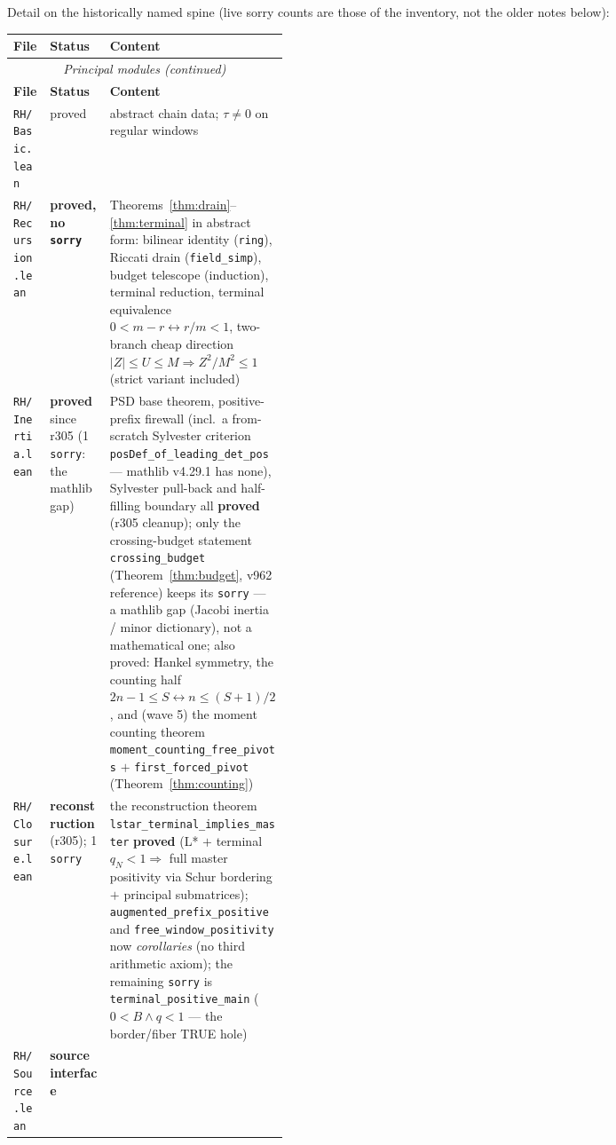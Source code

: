 \documentclass[11pt]{article}
\theoremstyle{definition}
\theoremstyle{remark}
\begin{document}
\noindent Detail on the historically named spine (live sorry counts are
those of the inventory, not the older notes below):

\begingroup\small
\begin{longtable}{@{}llp{0.36\linewidth}@{}}
\toprule
\textbf{File} & \textbf{Status} & \textbf{Content}\\
\midrule
\endfirsthead
\multicolumn{3}{c}{\small\itshape Principal modules (continued)}\\
\toprule
\textbf{File} & \textbf{Status} & \textbf{Content}\\
\midrule
\endhead
\texttt{RH/Basic.lean} & proved & abstract chain data; $\tau\ne0$ on
regular windows\\
\texttt{RH/Recursion.lean} & \textbf{proved, no \texttt{sorry}} &
Theorems~\ref{thm:drain}--\ref{thm:terminal} in abstract form: bilinear
identity (\texttt{ring}), Riccati drain (\texttt{field\_simp}), budget
telescope (induction), terminal reduction, terminal equivalence
$0<m-r\leftrightarrow r/m<1$, two-branch cheap direction
$|Z|\le U\le M\Rightarrow Z^2/M^2\le1$ (strict variant included)\\
\texttt{RH/Inertia.lean} & \textbf{proved} since r305 (1
\texttt{sorry}: the mathlib gap) & PSD base theorem, positive-prefix
firewall (incl.\ a from-scratch Sylvester criterion
\texttt{posDef\_of\_leading\_det\_pos} --- mathlib v4.29.1 has
none), Sylvester pull-back and half-filling boundary all
\textbf{proved} (r305 cleanup); only the crossing-budget statement
\texttt{crossing\_budget} (Theorem~\ref{thm:budget}, v962
reference) keeps its \texttt{sorry} --- a mathlib gap (Jacobi
inertia / minor dictionary), not a mathematical one; also proved:
Hankel symmetry, the counting half
$2n-1\le S\leftrightarrow n\le(S{+}1)/2$, and (wave 5) the moment
counting theorem \texttt{moment\_counting\_free\_pivots} $+$
\texttt{first\_forced\_pivot} (Theorem~\ref{thm:counting})\\
\texttt{RH/Closure.lean} & \textbf{reconstruction} (r305); 1
\texttt{sorry} & the reconstruction theorem
\texttt{lstar\_terminal\_implies\_master} \textbf{proved} (L* $+$
terminal $q_N<1 \Rightarrow$ full master positivity via Schur
bordering $+$ principal submatrices);
\texttt{augmented\_prefix\_positive} and
\texttt{free\_window\_positivity} now \emph{corollaries} (no third
arithmetic axiom); the remaining \texttt{sorry} is
\texttt{terminal\_positive\_main} ($0<B \wedge q<1$ --- the
border/fiber TRUE hole)\\
\texttt{RH/Source.lean} & \textbf{source interface}

\end{longtable}
\end{document}
